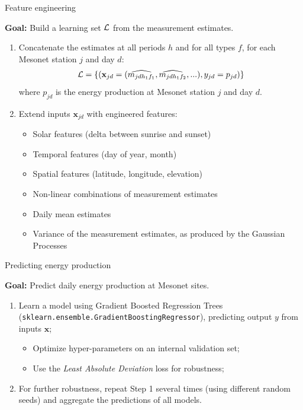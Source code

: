 \documentclass[handout]{beamer}
\begin{document}

\begin{frame}{Feature engineering}

\textbf{Goal:} Build a learning set ${\cal L}$ from the measurement estimates.

\begin{enumerate}

\item Concatenate the estimates at all periods $h$ and for all types $f$, for
each Mesonet station $j$ and day $d$:
$${\cal L} = \{ (\mathbf{x}_{jd} = (\widehat{m_{jd{h_1}{f_1}}}, \widehat{m_{jd{h_1}{f_2}}}, ...), y_{jd} = p_{jd}) \}$$
where $p_{jd}$ is the energy production at Mesonet station $j$ and day $d$.

\item Extend inputs $\mathbf{x}_{jd}$ with engineered features:
\begin{itemize}
\item Solar features (delta between sunrise and sunset)
\item Temporal features (day of year, month)
\item Spatial features (latitude, longitude, elevation)
\item Non-linear combinations of measurement estimates
\item Daily mean estimates
\item Variance of the measurement estimates, as produced by the Gaussian Processes
\end{itemize}

\end{enumerate}

\end{frame}



\begin{frame}{Predicting energy production}

\textbf{Goal:} Predict daily energy production at Mesonet sites.

\begin{enumerate}
\item Learn a model using Gradient Boosted Regression Trees (\texttt{sklearn.ensemble.GradientBoostingRegressor}), predicting output $y$ from inputs $\mathbf{x}$;
    \begin{itemize}
        \item Optimize hyper-parameters on an internal validation set;
        \item Use the \textit{Least Absolute Deviation} loss for robustness;
    \end{itemize}
\item For further robustness, repeat Step 1 several times (using different random seeds) and aggregate the predictions of all models.
\end{enumerate}

\end{frame}
\end{document}
